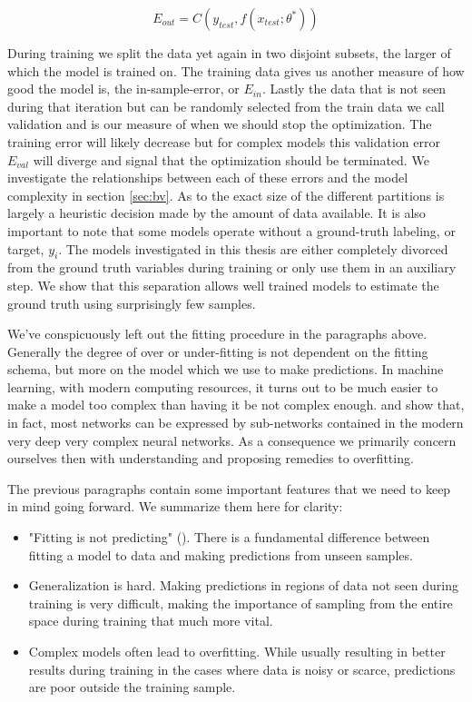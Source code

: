\begin{equation}
E_{out} = C(y_{test}, f(x_{test}; \theta^*))
\end{equation}

\noindent During training we split the data yet again in two disjoint subsets, the larger of which the model is trained on. The training data gives us another measure of how good the model is, the in-sample-error, or $E_{in}$. Lastly the data that is not seen during that iteration but can be randomly selected from the train data we call validation and is our measure of when we should stop the optimization. The training error will likely decrease but for complex models this validation error $E_{val}$ will diverge and signal that the optimization should be terminated. We investigate the relationships between each of these errors and the model complexity in section \ref{sec:bv}. As to the exact size of the different partitions is largely a heuristic decision made by the amount of data available. It is also important to note that some models operate without a ground-truth labeling, or target, $y_i$. The models investigated in this thesis are either completely divorced from the ground truth variables during training or only use them in an auxiliary step. We show that this separation allows well trained models to estimate the ground truth using surprisingly few samples. 

We've conspicuously left out the fitting procedure in the paragraphs above. Generally the degree of over or under-fitting is not dependent on the fitting schema, but more on the model which we use to make predictions. In machine learning, with modern computing resources, it turns out to be much easier to make a model too complex than having it be not complex enough. \citet{Frankle2019} and \citet{Frankle2018} show that, in fact, most networks can be expressed by sub-networks contained in the modern very deep very complex neural networks. As a consequence we primarily concern ourselves then with understanding and proposing remedies to overfitting. 

The previous paragraphs contain some important features that we need to keep in mind going forward. We summarize them here for clarity: 
\begin{itemize}
\item "Fitting is not predicting" (\cite{Mehta2019}). There is a fundamental difference between fitting a model to data and making predictions from unseen samples. \\
\item Generalization is hard. Making predictions in regions of data not seen during training is very difficult, making the importance of sampling from the entire space during training that much more vital. \\
\item Complex models often lead to overfitting. While usually resulting in better results during training in the cases where data is noisy or scarce, predictions are poor outside the training sample. 
\end{itemize}



